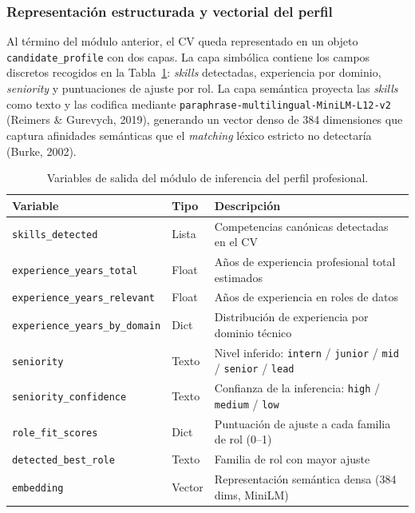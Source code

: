 \subsubsection{Representación estructurada y vectorial del perfil}
\label{subsubsec:representacion_perfil}
Al término del módulo anterior, el CV queda representado en un objeto \texttt{candidate\_profile} con dos capas. La capa simbólica contiene los campos discretos recogidos en la Tabla~\ref{tab:tabla3_4}: \textit{skills} detectadas, experiencia por dominio, \textit{seniority} y puntuaciones de ajuste por rol. La capa semántica proyecta las \textit{skills} como texto y las codifica mediante \texttt{paraphrase-multilingual-MiniLM-L12-v2} (Reimers \& Gurevych, 2019), generando un vector denso de 384 dimensiones que captura afinidades semánticas que el \textit{matching} léxico estricto no detectaría (Burke, 2002).

\begin{table}[H]
  \caption{Variables de salida del módulo de inferencia del perfil profesional.}
  \label{tab:tabla3_4}
  \centering
  \footnotesize
  \begin{tabular}{|p{4.5cm}|p{2.0cm}|p{7.0cm}|}
    \hline
    \rowcolor{gray!15}
    \textbf{Variable} & \textbf{Tipo} & \textbf{Descripción} \\
    \hline
    \texttt{skills\_detected}              & Lista   & Competencias canónicas detectadas en el CV \\
    \hline
    \texttt{experience\_years\_total}      & Float   & Años de experiencia profesional total estimados \\
    \hline
    \texttt{experience\_years\_relevant}   & Float   & Años de experiencia en roles de datos \\
    \hline
    \texttt{experience\_years\_by\_domain} & Dict    & Distribución de experiencia por dominio técnico \\
    \hline
    \texttt{seniority}                     & Texto   & Nivel inferido: \texttt{intern} / \texttt{junior} / \texttt{mid} / \texttt{senior} / \texttt{lead} \\
    \hline
    \texttt{seniority\_confidence}         & Texto   & Confianza de la inferencia: \texttt{high} / \texttt{medium} / \texttt{low} \\
    \hline
    \texttt{role\_fit\_scores}             & Dict    & Puntuación de ajuste a cada familia de rol (0--1) \\
    \hline
    \texttt{detected\_best\_role}          & Texto   & Familia de rol con mayor ajuste \\
    \hline
    \texttt{embedding}                     & Vector  & Representación semántica densa (384 dims, MiniLM) \\
    \hline
  \end{tabular}
\end{table}

